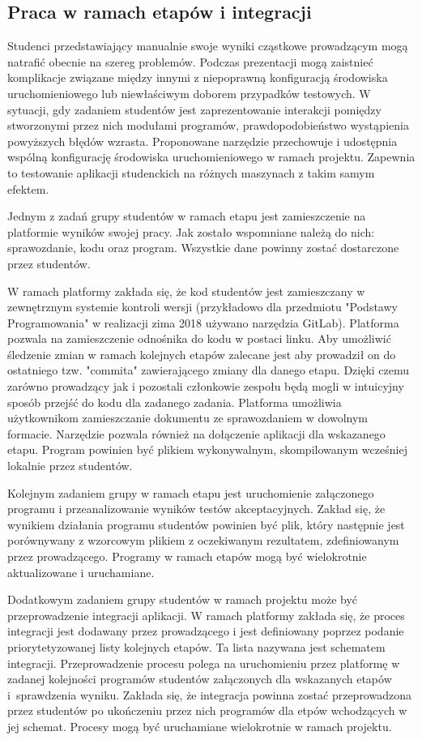 \subsection{Praca w ramach etapów i integracji}
\label{work_in_stages_and_integrations}


Studenci przedstawiający manualnie swoje wyniki cząstkowe prowadzącym mogą natrafić obecnie na szereg problemów.
Podczas prezentacji mogą zaistnieć komplikacje związane między innymi z niepoprawną konfiguracją środowiska uruchomieniowego lub niewłaściwym doborem przypadków testowych.
W sytuacji, gdy zadaniem studentów jest zaprezentowanie interakcji pomiędzy stworzonymi przez nich modułami programów, prawdopodobieństwo wystąpienia powyższych błędów wzrasta.
Proponowane narzędzie przechowuje i udostępnia wspólną konfigurację środowiska uruchomieniowego w ramach projektu.
Zapewnia to testowanie aplikacji studenckich na różnych maszynach z takim samym efektem.

Jednym z zadań grupy studentów w ramach etapu jest zamieszczenie na platformie wyników swojej pracy.
Jak zostało wspomniane należą do nich: sprawozdanie, kodu oraz program.
Wszystkie dane powinny zostać dostarczone przez studentów.

W ramach platformy zakłada się, że kod studentów jest zamieszczany w zewnętrznym systemie kontroli wersji (przykładowo dla przedmiotu "Podstawy Programowania" w realizacji zima 2018 używano narzędzia GitLab).
Platforma pozwala na zamieszczenie odnośnika do kodu w postaci linku.
Aby umożliwić śledzenie zmian w ramach kolejnych etapów zalecane jest aby prowadził on do ostatniego tzw. "commita" zawierającego zmiany dla danego etapu.
Dzięki czemu zarówno prowadzący jak i pozostali członkowie zespołu będą mogli w intuicyjny sposób przejść do kodu dla zadanego zadania.
Platforma umożliwia użytkownikom zamieszczanie dokumentu ze sprawozdaniem w dowolnym formacie.
Narzędzie pozwala również na dołączenie aplikacji dla wskazanego etapu.
Program powinien być plikiem wykonywalnym, skompilowanym wcześniej lokalnie przez studentów.

Kolejnym zadaniem grupy w ramach etapu jest uruchomienie załączonego programu i przeanalizowanie wyników testów akceptacyjnych.
Zakład się, że wynikiem działania programu studentów powinien być plik, który następnie jest porównywany z wzorcowym plikiem z oczekiwanym rezultatem, zdefiniowanym przez prowadzącego.
Programy w ramach etapów mogą być wielokrotnie aktualizowane i uruchamiane.


Dodatkowym zadaniem grupy studentów w ramach projektu może być przeprowadzenie integracji aplikacji.
W ramach platformy zakłada się, że proces integracji jest dodawany przez prowadzącego i jest definiowany poprzez podanie priorytetyzowanej listy kolejnych etapów.
Ta lista nazywana jest schematem integracji.
Przeprowadzenie procesu polega na uruchomieniu przez platformę w zadanej kolejności programów studentów załączonych dla wskazanych etapów i~sprawdzenia wyniku.
Zakłada się, że integracja powinna zostać przeprowadzona przez studentów po ukończeniu przez nich programów dla etpów wchodzących w jej schemat.
Procesy mogą być uruchamiane wielokrotnie w ramach projektu.

